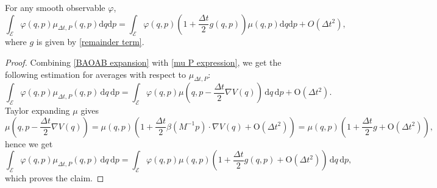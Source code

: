 \begin{corollary}\label{corr2 baoa expansion}
  For any smooth observable $\varphi$,
  \begin{equation}
    \label{corr2 ccl}
    \int_{\mathcal E}\varphi(q,p)\mu_{\Delta t,P}(q,p)\mathrm{d}q \mathrm{d}p=\int_{\mathcal E}\varphi(q,p)\left(1+\frac{\Delta t}2g(q,p)\right)\mu(q,p)\mathrm{d}q \mathrm{d}p +O(\Delta t^2),
    \end{equation}
where $g$ is given by \eqref{remainder term}.
\end{corollary}
\begin{proof}
  Combining \eqref{BAOAB expansion} with \eqref{mu P expression}, we get the following estimation for averages with respect to $\mu_{\Delta t,P}$:
  \begin{equation}
    \label{}
   \int_{\mathcal E}\varphi(q,p)\mu_{\Delta t,P}(q,p)\,\mathrm{d}q\, \mathrm{d}p= \int_{\mathcal E}\varphi(q,p)\mu\left(q,p-\frac{\Delta t}2\nabla V(q)\right)\,\mathrm{d}q\, \mathrm{d}p+ \mathrm{O}(\Delta t^2).
  \end{equation}
  Taylor expanding $\mu$ gives
$$\mu\left(q,p-\frac{\Delta t}2\nabla V(q)\right)=\mu(q,p)\left(1+\frac{\Delta t}2\beta(M^{-1}p)\cdot \nabla V(q) +\mathrm{O}(\Delta t^2)\right)=\mu(q,p)\left(1+\frac{\Delta t}2g+\mathrm{O}(\Delta t^2)\right),$$
hence we get 
\begin{equation}
\label{BAOA first order}
\int_{\mathcal E}\varphi(q,p)\mu_{\Delta t,P}(q,p)\,\mathrm{d}q\, \mathrm{d}p=\int_{\mathcal E}\varphi(q,p)\mu(q,p)\left(1+\frac{\Delta t}2g(q,p)+\mathrm{O}(\Delta t^2)\right)\,\mathrm{d}q\, \mathrm{d}p,
\end{equation}
which proves the claim.
\end{proof}


